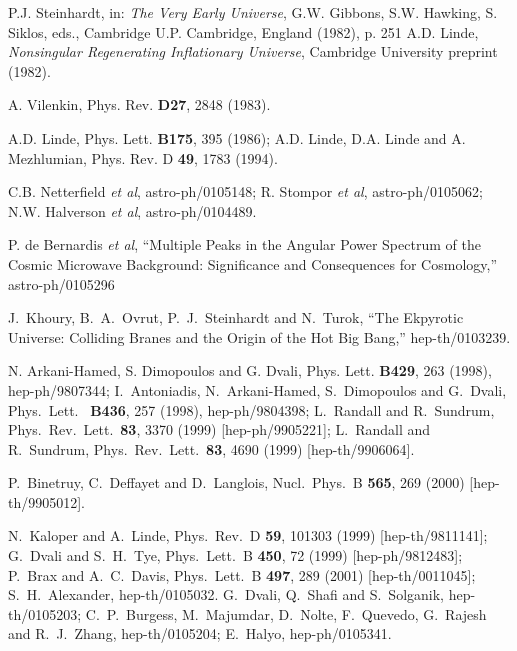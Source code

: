 \documentclass[a4paper,12pt]{article}
\begin{document}
\begin{thebibliography}{99}
 

 P.J. Steinhardt, in:  {\it  The Very Early Universe}, G.W.
Gibbons, S.W. Hawking, S. Siklos, eds., Cambridge U.P. Cambridge, England
(1982), p. 251
 A.D. Linde,   {\it  Nonsingular Regenerating
Inflationary Universe}, Cambridge University preprint (1982).

 A. Vilenkin, Phys.    Rev.  {\bf D27},  2848 (1983).

 A.D. Linde,   Phys. Lett.  {\bf B175}, 395  (1986);
A.D. Linde, D.A. Linde  and
A. Mezhlumian,    Phys.   Rev. D {\bf 49},  1783  (1994).

 C.B. Netterfield {\it et al}, astro-ph/0105148;
R. Stompor {\it et al}, astro-ph/0105062; N.W. Halverson {\it et al}, astro-ph/0104489.

 P. de Bernardis {\it et al}, ``Multiple Peaks in the Angular Power Spectrum of the Cosmic Microwave Background: Significance and
     Consequences for Cosmology,'' astro-ph/0105296

 
J.~Khoury, B.~A.~Ovrut, P.~J.~Steinhardt and N.~Turok,  ``The Ekpyrotic Universe: Colliding Branes and the Origin of the Hot Big   
Bang,''  hep-th/0103239.   
   
   
   
 

 N. Arkani-Hamed, S. Dimopoulos and G. Dvali,    Phys.   
Lett. {\bf B429}, 263 (1998),   hep-ph/9807344;   I.~Antoniadis,   
N.~Arkani-Hamed, S.~Dimopoulos and G.~Dvali,  Phys.\ Lett.\  {\bf   
B436}, 257 (1998), hep-ph/9804398; L.~Randall and R.~Sundrum,   
Phys.\ Rev.\ Lett.\  {\bf 83}, 3370 (1999) [hep-ph/9905221]; L.~Randall   
and R.~Sundrum, Phys.\ Rev.\   
Lett.\  {\bf 83}, 4690 (1999) [hep-th/9906064].   
   
   
P.~Binetruy, C.~Deffayet and D.~Langlois,  Nucl.\ Phys.\ B {\bf 565}, 269 (2000)   
[hep-th/9905012].   
   
 N.~Kaloper and A.~Linde,
Phys.\ Rev.\ D {\bf 59}, 101303 (1999)
[hep-th/9811141]; G.~Dvali and S.~H.~Tye,  Phys.\ Lett.\ B {\bf 450}, 72 (1999)   
[hep-ph/9812483]; P.~Brax and A.~C.~Davis,
Phys.\ Lett.\ B {\bf 497}, 289 (2001)
[hep-th/0011045]; S.~H.~Alexander, hep-th/0105032. G.~Dvali, Q.~Shafi and S.~Solganik,  hep-th/0105203; C.~P.~Burgess, M.~Majumdar,   
D.~Nolte, F.~Quevedo, G.~Rajesh and R.~J.~Zhang, hep-th/0105204; E.~Halyo,
hep-ph/0105341.   
   

\end{thebibliography}
\end{document}
